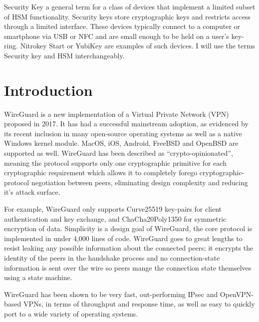 \documentclass [11pt, proquest] {uwthesis}[2020/02/24]
\begin{document}
\begin{glossary}
\item[Security Key]
a general term for a class of devices that implement a limited subset of HSM functionality. Security keys store cryptographic keys and restricts access through a limited interface. These devices typically connect to a computer or smartphone via USB or NFC and are small enough to be held on a user's key-ring.
Nitrokey Start\cite{nitrokey_nitrokey_2022} or YubiKey\cite{yubico_discover_2021} are examples of such devices. 
I will use the terms Security key and HSM interchangeably.

\end{glossary}

\textpages

\chapter {Introduction} \label{introduction}

WireGuard is a new implementation of a Virtual Private Network (VPN) proposed in 2017. It has had a successful mainstream adoption, as evidenced by its recent inclusion in many open-source operating systems\cite{donenfeld_wireguard_nodate} as well as a native Windows kernel module\cite{bernstein_wireguard-nt_2022}. MacOS, iOS, Android, FreeBSD and OpenBSD are supported as well.
WireGuard has been described as “crypto-opinionated”, meaning the protocol supports only one cryptographic primitive for each cryptographic requirement which allows it to completely forego cryptographic-protocol negotiation between peers, eliminating design complexity and reducing it's attack surface. 

For example, WireGuard only supports Curve25519 key-pairs for client authentication and key exchange, and ChaCha20Poly1350 for symmetric encryption\cite{donenfeld_wireguard_2017} of data.
Simplicity is a design goal of WireGuard, the core protocol is implemented in under 4,000 lines of code. WireGuard goes to great lengths to resist leaking any possible information about the connected peers; it encrypts the identity of the peers in the handshake process and no connection-state information is sent over the wire so peers mange the connection state themselves using a state machine. 

WireGuard has been shown to be very fast, out-performing IPsec and OpenVPN-based VPNs, in terms of throughput and response time\cite{donenfeld_performance_2018}, as well as easy to quickly port to a wide variety of operating systems. 
\end{document}
